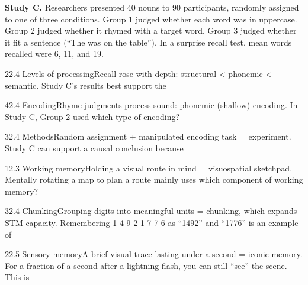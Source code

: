 \documentclass[11pt]{article}
\begin{document}
\begin{stimulus}
\textbf{Study C.} Researchers presented 40 nouns to 90 participants, randomly assigned to one of three conditions. Group 1 judged whether each word was in uppercase. Group 2 judged whether it rhymed with a target word. Group 3 judged whether it fit a sentence (``The \underline{\hspace{2em}} was on the table''). In a surprise recall test, mean words recalled were 6, 11, and 19.
\end{stimulus}

\begin{q}{2}{2.4 Levels of processing}{Recall rose with depth: structural < phonemic < semantic.}
Study C's results best support the
\end{q}

\begin{q}{4}{2.4 Encoding}{Rhyme judgments process sound: phonemic (shallow) encoding.}
In Study C, Group 2 used which type of encoding?
\end{q}

\begin{q}{3}{2.4 Methods}{Random assignment + manipulated encoding task = experiment.}
Study C can support a causal conclusion because
\end{q}

\begin{q}{1}{2.3 Working memory}{Holding a visual route in mind = visuospatial sketchpad.}
Mentally rotating a map to plan a route mainly uses which component of working memory?
\end{q}

\begin{q}{3}{2.4 Chunking}{Grouping digits into meaningful units = chunking, which expands STM capacity.}
Remembering 1-4-9-2-1-7-7-6 as ``1492'' and ``1776'' is an example of
\end{q}

\begin{q}{2}{2.5 Sensory memory}{A brief visual trace lasting under a second = iconic memory.}
For a fraction of a second after a lightning flash, you can still ``see'' the scene. This is
\end{q}
\end{document}
